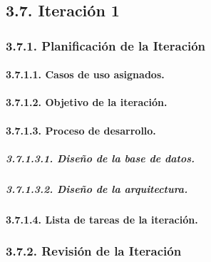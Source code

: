 \subsection{3.7. Iteración 1}

\subsubsection{3.7.1. Planificación de la Iteración}

\paragraph{3.7.1.1. Casos de uso asignados.}


\paragraph{3.7.1.2. Objetivo de la iteración.}


\paragraph{3.7.1.3. Proceso de desarrollo.}

\subparagraph{3.7.1.3.1. Diseño de la base de datos.}


\subparagraph{3.7.1.3.2. Diseño de la arquitectura.}


\paragraph{3.7.1.4. Lista de tareas de la iteración.}


\subsubsection{3.7.2. Revisión de la Iteración}


